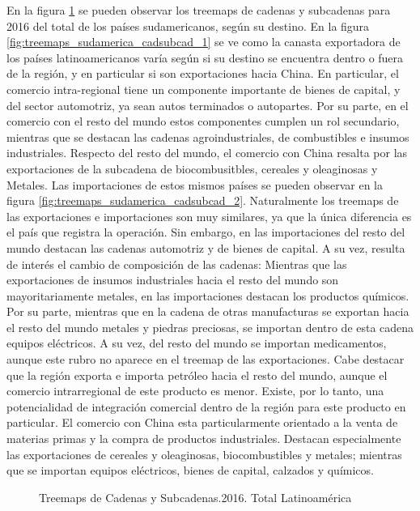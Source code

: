 \documentclass[class=article, crop=false]{standalone}
\begin{document}
	En la figura \ref{fig:treemaps_sudamerica_cadsubcad} se pueden observar los treemaps de cadenas y subcadenas para 2016 del total de los países sudamericanos, según su destino. En la figura \ref{fig:treemaps_sudamerica_cadsubcad_1} se ve como la canasta exportadora de los países latinoamericanos varía según si su destino se encuentra dentro o fuera de la región, y en particular si son exportaciones hacia China. En particular, el comercio intra-regional tiene un componente importante de bienes de capital, y del sector automotriz, ya sean autos terminados o autopartes. Por su parte, en el comercio con el resto del mundo estos componentes cumplen un rol secundario, mientras que se destacan las cadenas agroindustriales, de combustibles e insumos industriales. Respecto del resto del mundo, el comercio con China resalta por las exportaciones de la subcadena de biocombusitbles, cereales y oleaginosas y Metales. 
	Las importaciones de estos mismos países se pueden observar en la figura \ref{fig:treemaps_sudamerica_cadsubcad_2}. Naturalmente los treemaps de las exportaciones e importaciones son muy similares, ya que la única diferencia es el país que registra la operación. Sin embargo, en las importaciones del resto del mundo destacan las cadenas automotriz y de bienes de capital. A su vez, resulta de interés el cambio de composición de las cadenas: Mientras que las exportaciones de insumos industriales hacia el resto del mundo son mayoritariamente metales, en las importaciones destacan los productos químicos. Por su parte, mientras que en la cadena de otras manufacturas se exportan hacia el resto del mundo metales y piedras preciosas, se importan dentro de esta cadena equipos eléctricos. A su vez, del resto del mundo se importan medicamentos, aunque este rubro no aparece en el treemap de las exportaciones. Cabe destacar que la región exporta e importa petróleo hacia el resto del mundo, aunque el comercio intrarregional de este producto es menor. Existe, por lo tanto, una potencialidad de integración comercial dentro de la región para este producto en particular. 
	El comercio con China esta particularmente orientado a la venta de materias primas y la compra de productos industriales. Destacan especialmente las exportaciones de cereales y oleaginosas, biocombustibles y metales; mientras que se importan equipos eléctricos, bienes de capital, calzados y químicos. 
	

\begin{figure}
	\centering
	\caption{Treemaps de Cadenas y Subcadenas.2016. Total Latinoamérica}
	\label{fig:treemaps_sudamerica_cadsubcad}
\end{figure}
\end{document}
